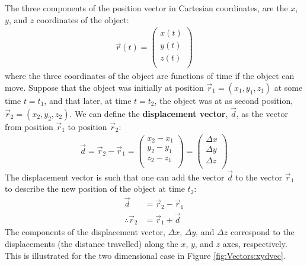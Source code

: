 The three components of the position vector in Cartesian coordinates, are the $x$, $y$, and $z$ coordinates of the object:
\begin{align*}
\vec r(t) = \begin{pmatrix}
           x(t) \\
           y(t) \\
           z(t) \\
         \end{pmatrix}
\end{align*}  
where the three coordinates of the object are functions of time if the object can move. Suppose that the object was initially at position $\vec r_1=(x_1, y_1, z_1)$ at some time $t=t_1$, and that later, at time $t=t_2$, the object was at as second position, $\vec r_2=(x_2, y_2, z_2)$. We can define the \textbf{displacement vector}, $\vec  d$, as the vector from position $\vec r_1$ to position $\vec r_2$:
\begin{align*}
 \vec d = \vec r_2 - \vec r_1 =\begin{pmatrix}
           x_2-x_1 \\
           y_2-y_1 \\
           z_2-z_1 \\
         \end{pmatrix} = \begin{pmatrix}
           \Delta x \\
           \Delta y \\
           \Delta z \\
         \end{pmatrix}
\end{align*}
The displacement vector is such that one can add the vector $\vec d$ to the vector $\vec r_1$ to describe the new position of the object at time $t_2$:
\begin{align*}
\vec d &= \vec r_2 - \vec r_1\\
\therefore \vec r_2 &= \vec r_1 + \vec d
\end{align*}
The components of the displacement vector, $\Delta x$, $\Delta y$, and $\Delta z$ correspond to the displacements (the distance travelled) along the $x$, $y$, and $z$ axes, respectively. This is illustrated for the two dimensional case in Figure \ref{fig:Vectors:xydvec}.


